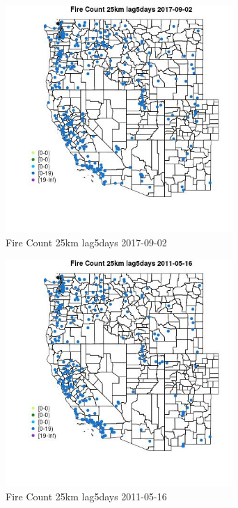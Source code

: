 \begin{figure} 
\centering  
\includegraphics[width=0.77\textwidth]{Code_Outputs/Report_ML_input_PM25_Step4_part_e_de_duplicated_aves_compiled_2019-05-20wNAs_MapObsFire_Count_25km_lag5days2017-09-02.jpg} 
\caption{\label{fig:Report_ML_input_PM25_Step4_part_e_de_duplicated_aves_compiled_2019-05-20wNAsMapObsFire_Count_25km_lag5days2017-09-02}Fire Count 25km lag5days 2017-09-02} 
\end{figure} 
 

\clearpage 

\begin{figure} 
\centering  
\includegraphics[width=0.77\textwidth]{Code_Outputs/Report_ML_input_PM25_Step4_part_e_de_duplicated_aves_compiled_2019-05-20wNAs_MapObsFire_Count_25km_lag5days2011-05-16.jpg} 
\caption{\label{fig:Report_ML_input_PM25_Step4_part_e_de_duplicated_aves_compiled_2019-05-20wNAsMapObsFire_Count_25km_lag5days2011-05-16}Fire Count 25km lag5days 2011-05-16} 
\end{figure} 
 

